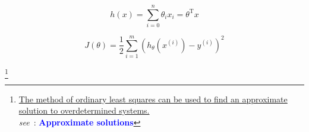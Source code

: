 \documentclass[a4paper, 12pt]{article}
\begin{document}
\begin{tcolorbox}[colback=red!5!white,colframe=red!75!black]
    \begin{equation}
        h(x) = \sum_{i = 0}^{n} \theta_{i}x_{i} = \theta^{\mathrm{T}}x
    \end{equation}
\end{tcolorbox}

\begin{tcolorbox}[enhanced,attach boxed title to top center={yshift=-3mm,yshifttext=-1mm},
  colback=blue!5!white,colframe=blue!75!black,colbacktitle=red!80!black,
  title=cost function,fonttitle=\bfseries,
  boxed title style={size=small,colframe=red!50!black} ]
    \begin{equation}
        J(\theta) = \frac{1}{2}\sum_{i = 1}^{m}(h_{\theta}(x^{(i)}) - y^{(i)})^2
    \end{equation}
\end{tcolorbox}
\footnote{\href{https://en.wikipedia.org/wiki/Overdetermined_system}{The method of ordinary least squares can be used to find an approximate solution to overdetermined systems.} \\
\textit{see}~: \textbf{\textcolor{blue}{Approximate solutions}}}
\end{document}
